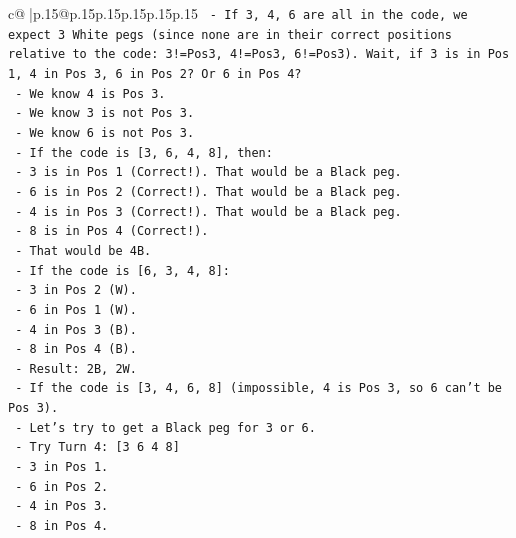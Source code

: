 \documentclass{article}
\begin{document}
{\begin{supertabular}{c@{$\;$}|p{.15\linewidth}@{}p{.15\linewidth}p{.15\linewidth}p{.15\linewidth}p{.15\linewidth}p{.15\linewidth}}
{{{\texttt{                    {-} If 3, 4, 6 are all in the code, we expect 3 White pegs (since none are in their correct positions relative to the code: 3!=Pos3, 4!=Pos3, 6!=Pos3). Wait, if 3 is in Pos 1, 4 in Pos 3, 6 in Pos 2? Or 6 in Pos 4?} \\
\texttt{                    {-} We know 4 is Pos 3.} \\
\texttt{                    {-} We know 3 is not Pos 3.} \\
\texttt{                    {-} We know 6 is not Pos 3.} \\
\texttt{                    {-} If the code is {[}3, 6, 4, 8{]}, then:} \\
\texttt{                      {-} 3 is in Pos 1 (Correct!). That would be a Black peg.} \\
\texttt{                      {-} 6 is in Pos 2 (Correct!). That would be a Black peg.} \\
\texttt{                      {-} 4 is in Pos 3 (Correct!). That would be a Black peg.} \\
\texttt{                      {-} 8 is in Pos 4 (Correct!).} \\
\texttt{                      {-} That would be 4B.} \\
\texttt{                    {-} If the code is {[}6, 3, 4, 8{]}:} \\
\texttt{                      {-} 3 in Pos 2 (W).} \\
\texttt{                      {-} 6 in Pos 1 (W).} \\
\texttt{                      {-} 4 in Pos 3 (B).} \\
\texttt{                      {-} 8 in Pos 4 (B).} \\
\texttt{                      {-} Result: 2B, 2W.} \\
\texttt{                    {-} If the code is {[}3, 4, 6, 8{]} (impossible, 4 is Pos 3, so 6 can't be Pos 3).} \\
\texttt{                    {-} Let's try to get a Black peg for 3 or 6.} \\
\texttt{                    {-} Try Turn 4: {[}3 6 4 8{]}} \\
\texttt{                      {-} 3 in Pos 1.} \\
\texttt{                      {-} 6 in Pos 2.} \\
\texttt{                      {-} 4 in Pos 3.} \\
\texttt{                      {-} 8 in Pos 4.} \\
}}}
\end{supertabular}}
\end{document}
